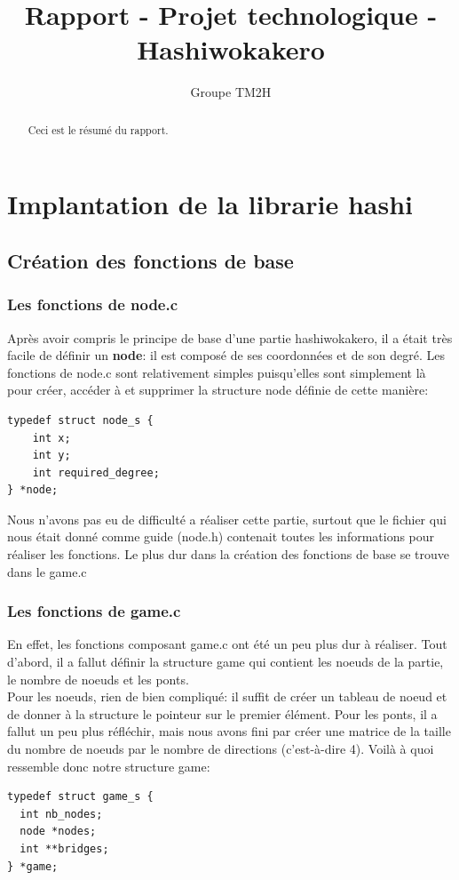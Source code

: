 \documentclass[12pt]{report}
\title{Rapport - Projet technologique - Hashiwokakero}
\author{Groupe TM2H}
\begin{document}
\maketitle

\begin{abstract}
Ceci est le résumé du rapport.
\end{abstract}

\tableofcontents

\chapter{Implantation de la librarie hashi}

\section{Création des fonctions de base}

\subsection{Les fonctions de node.c}
\textnormal{Après avoir compris le principe de base d'une partie hashiwokakero, il a était très facile de définir un \textbf{node}: il est composé de ses coordonnées et de son degré. Les fonctions de node.c sont relativement simples puisqu'elles sont simplement là pour créer, accéder à et supprimer la structure node définie de cette manière:}
\begin{verbatim}
typedef struct node_s {
	int x;
	int y;
	int required_degree;
} *node;
\end{verbatim}

\textnormal{Nous n'avons pas eu de difficulté a réaliser cette partie, surtout que le fichier qui nous était donné comme guide (node.h) contenait toutes les informations pour réaliser les fonctions. Le plus dur dans la création des fonctions de base se trouve dans le game.c}
\subsection{Les fonctions de game.c}
\textnormal{En effet, les fonctions composant game.c ont été un peu plus dur à réaliser. Tout d'abord, il a fallut définir la structure game qui contient les noeuds de la partie, le nombre de noeuds et les ponts.\\ Pour les noeuds, rien de bien compliqué: il suffit de créer un tableau de noeud et de donner à la structure le pointeur sur le premier élément. Pour les ponts, il a fallut un peu plus réfléchir, mais nous avons fini par créer une matrice de la taille du nombre de noeuds par le nombre de directions (c'est-à-dire 4). Voilà à quoi ressemble donc notre structure game:}
\begin{verbatim}
typedef struct game_s {
  int nb_nodes;
  node *nodes; 
  int **bridges;
} *game;
\end{verbatim}
\end{document}
